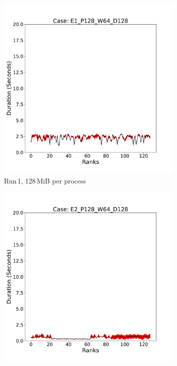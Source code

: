 \begin{figure}[h!]
     \centering
     \begin{subfigure}[b]{0.3\textwidth}
         \centering
         \includegraphics[width=\textwidth, height=\textwidth]{figures/deisa2__E1_P128_W64_D128.pdf}
         \caption{Run\,1, 128\,MiB per process}
         \label{fig:E1_128_d2}
     \end{subfigure}
     \hfill
     \begin{subfigure}[b]{0.3\textwidth}
         \centering
         \includegraphics[width=\textwidth, height=\textwidth]{figures/deisa2__E2_P128_W64_D128.pdf}

\end{subfigure}
\end{figure}
